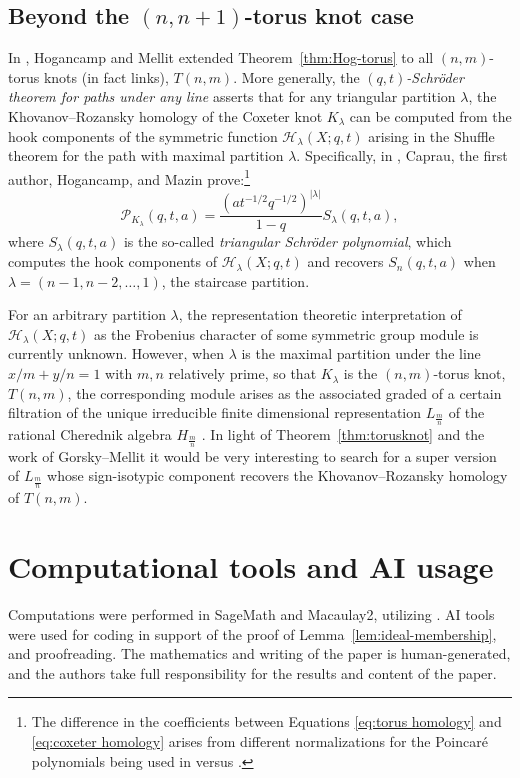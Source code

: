 \documentclass[11pt, noadjust, reqno]{amsart}
\theoremstyle{definition}
\theoremstyle{remark}
\numberwithin{equation}{section}
\newcommand{\0}{\emptyset}
\begin{document}
\subsection{Beyond the \texorpdfstring{$(n,n+1)$}{(n,n+1)}-torus knot case}
In \cite{hog-mellit}, Hogancamp and Mellit extended Theorem~\ref{thm:Hog-torus} to all $(n,m)$-torus knots (in fact links), $T(n,m)$. 
More generally, the \emph{$(q,t)$-Schr\"oder theorem for paths under any line} \cite[Section 6]{CGHM} asserts that for any triangular partition $\lambda$, the Khovanov--Rozansky homology of the Coxeter knot $K_\lambda$ can be computed from the hook components of the symmetric function $\mathcal{H}_\lambda(X;q,t)$ arising in the Shuffle theorem \cite{BHMPS-Paths} for the path with maximal partition $\lambda$. 
Specifically, in \cite[Theorem 5.19 and Corollary 6.12]{CGHM}, Caprau, the first author, Hogancamp, and Mazin prove:\footnote{The difference in the coefficients between Equations \eqref{eq:torus homology} and \eqref{eq:coxeter homology} arises from different normalizations for the Poincar\'e polynomials being used in \cite{Hog17} versus \cite{CGHM}.}
\begin{equation}\label{eq:coxeter homology}
  \mathcal{P}_{K_\lambda}(q,t,a)=
  \frac{(at^{-1/2}q^{-1/2})^{|\lambda|}}{1-q}
  S_\lambda(q,t,a),
\end{equation}
where $S_\lambda(q,t,a)$ is the so-called \emph{triangular Schr\"oder polynomial}, which computes the hook components of $\mathcal{H}_\lambda(X;q,t)$ and recovers $S_n(q,t,a)$ when $\lambda=(n-1,n-2,\dots,1)$, the staircase partition. 

For an arbitrary partition $\lambda$, the representation theoretic interpretation of $\mathcal{H}_\lambda(X;q,t)$ as the Frobenius character of some symmetric group module is currently unknown.
However, when $\lambda$ is the maximal partition under the line $x/m+y/n=1$ with $m,n$ relatively prime, so that $K_\lambda$ is the $(n,m)$-torus knot, $T(n,m)$, the corresponding module arises as the associated graded of a certain filtration of the unique irreducible finite dimensional representation $L_{\frac{m}{n}}$ of the rational Cherednik algebra $H_{\frac{m}{n}}$ \cite{Xinchun, GorskyNegut, Gorsky_Oblomkov_Rasmussen_Shende_2014, Hikita}. 
In light of Theorem~\ref{thm:torusknot} and the work of Gorsky--Mellit \cite{GorskyMellit} it would be very interesting to search for a super version of $L_{\frac{m}{n}}$ whose sign-isotypic component recovers the Khovanov--Rozansky homology of $T(n,m)$.

\section*{Computational tools and AI usage}

Computations were performed in SageMath and Macaulay2, utilizing \cite{Zabrocki-code, Bergeron-code}. 
AI tools were used for coding in support of the proof of Lemma~\ref{lem:ideal-membership}, and proofreading.
The mathematics and writing of the paper is human-generated, and the authors take full responsibility for the results and content of the paper.



\end{document}
